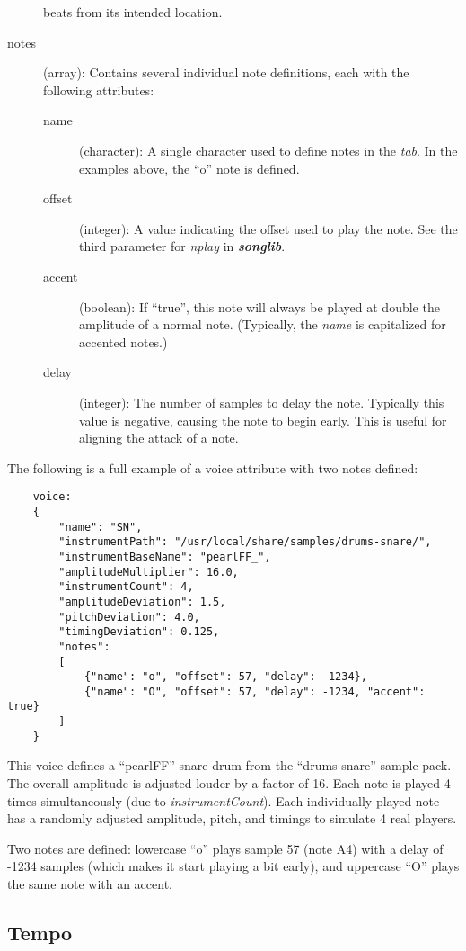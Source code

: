 \documentclass{article}
\newcommand\songlib {{\it\bf songlib}}
\begin{document}
\begin{description}
    beats from its intended location.
\item[notes] (array):
    Contains several individual note definitions, each with the following
    attributes:
    \begin{description} \item[name] (character):
        A single character used to define notes in the {\it tab}.
        In the examples above, the ``o'' note is defined.
    \item[offset] (integer):
        A value indicating the offset used to play the note.  See the
        third parameter for {\it nplay} in \songlib.
    \item[accent] (boolean):
        If ``true'', this note will always be played at double the
        amplitude of a normal note.  (Typically, the {\it name} is capitalized
        for accented notes.)
    \item[delay] (integer):
        The number of samples to delay the note.  Typically this value is
        negative, causing the note to begin early.  This is useful for aligning
        the attack of a note.
    \end{description}
\end{description}

The following is a full example of a voice attribute with two notes defined:

\begin{verbatim}
	voice:
	{
		"name": "SN",
		"instrumentPath": "/usr/local/share/samples/drums-snare/",
		"instrumentBaseName": "pearlFF_",
		"amplitudeMultiplier": 16.0,
		"instrumentCount": 4,
		"amplitudeDeviation": 1.5,
		"pitchDeviation": 4.0,
		"timingDeviation": 0.125,
		"notes":
		[
		    {"name": "o", "offset": 57, "delay": -1234},
		    {"name": "O", "offset": 57, "delay": -1234, "accent": true}
		]
	}
\end{verbatim}

This voice defines a ``pearlFF'' snare drum from the ``drums-snare'' sample
pack.  The overall amplitude is adjusted louder by a factor of 16.  Each note is
played 4 times simultaneously (due to {\it instrumentCount}).  Each individually
played note has a randomly adjusted amplitude, pitch, and timings to simulate 4
real players.

Two notes are defined:  lowercase ``o'' plays sample 57 (note A4) with a delay
of -1234 samples (which makes it start playing a bit early), and uppercase ``O''
plays the same note with an accent.

\subsection*{Tempo}
\end{document}
